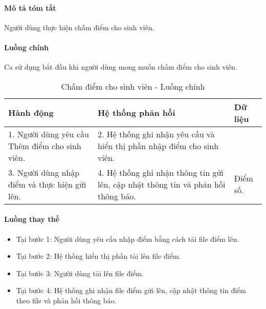 \documentclass[./../main.tex]{subfiles}
\begin{document}
\paragraph*{Mô tả tóm tắt}

Người dùng thực hiện chấm điểm cho sinh viên.

\paragraph*{Luồng chính} Ca sử dụng bắt đầu khi người dùng mong muốn chấm điểm cho sinh viên.

\begin{table}[H]
	\caption{Chấm điểm cho sinh viên - Luồng chính}
	\label{tab:score}
	\begin{tabularx}{\textwidth}{|X|X|X|}
		\hline
		\textbf{Hành động}                             & \textbf{Hệ thống phản hồi}                                                        & \textbf{Dữ liệu} \\ \hline
		1. Người dùng yêu cầu Thêm điểm cho sinh viên. & 2. Hệ thống ghi nhận yêu cầu và hiển thị phần nhập điểm cho sinh viên.            &                  \\ \hline
		3. Người dùng nhập điểm và thực hiện gửi lên.  & 4. Hệ thống ghi nhận thông tin gửi lên, cập nhật thông tin và phản hồi thông báo. & Điểm số.         \\ \hline
	\end{tabularx}
\end{table}

\paragraph*{Luồng thay thế}

\begin{itemize}
	\item

	      Tại bước 1: Người dùng yêu cầu nhập điểm bằng cách tải file điểm lên.

	\item

	      Tại bước 2:  Hệ thống hiển thị phần tải lên file điểm.

	\item

	      Tại bước 3: Người dùng tải lên file điểm.

	\item

	      Tại bước 4: Hệ thống ghi nhận file điểm gửi lên, cập nhật thông tin điểm theo file và phản hồi thông báo.

\end{itemize}
\end{document}
